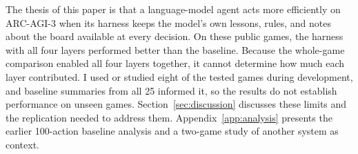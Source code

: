 The thesis of this paper is that a language-model agent acts more efficiently on ARC-AGI-3 when its harness keeps the model's own lessons, rules, and notes about the board available at every decision. On these public games, the harness with all four layers performed better than the baseline. Because the whole-game comparison enabled all four layers together, it cannot determine how much each layer contributed. I used or studied eight of the tested games during development, and baseline summaries from all 25 informed it, so the results do not establish performance on unseen games. Section~\ref{sec:discussion} discusses these limits and the replication needed to address them. Appendix~\ref{app:analysis} presents the earlier 100-action baseline analysis and a two-game study of another system as context.
